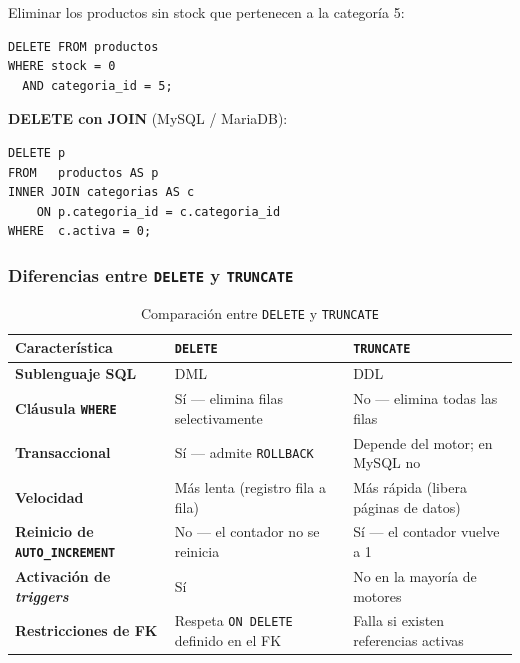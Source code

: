 \begin{ejemplo}
  Eliminar los productos sin stock que pertenecen a la categoría 5:

\begin{lstlisting}[style=sql, caption={DELETE con condición compuesta}]
DELETE FROM productos
WHERE stock = 0
  AND categoria_id = 5;
\end{lstlisting}
\end{ejemplo}

\textbf{DELETE con JOIN} (MySQL / MariaDB):

\begin{lstlisting}[style=sql, caption={DELETE que filtra mediante una tabla relacionada}]
DELETE p
FROM   productos AS p
INNER JOIN categorias AS c
    ON p.categoria_id = c.categoria_id
WHERE  c.activa = 0;
\end{lstlisting}

\subsubsection*{Diferencias entre \texttt{DELETE} y \texttt{TRUNCATE}}

\begin{table}[H]
  \centering
  \caption{Comparación entre \texttt{DELETE} y \texttt{TRUNCATE}}
  \renewcommand{\arraystretch}{1.3}
  \begin{tabularx}{\textwidth}{>{\bfseries}l X X}
    \toprule
    \textbf{Característica}     & \textbf{\texttt{DELETE}}                        & \textbf{\texttt{TRUNCATE}}                   \\
    \midrule
    Sublenguaje SQL             & DML                                             & DDL                                          \\
    Cláusula \texttt{WHERE}     & Sí — elimina filas selectivamente               & No — elimina todas las filas                 \\
    Transaccional               & Sí — admite \texttt{ROLLBACK}                   & Depende del motor; en MySQL no               \\
    Velocidad                   & Más lenta (registro fila a fila)                & Más rápida (libera páginas de datos)         \\
    Reinicio de \texttt{AUTO\_INCREMENT} & No — el contador no se reinicia       & Sí — el contador vuelve a 1                  \\
    Activación de \textit{triggers} & Sí                                         & No en la mayoría de motores                  \\
    Restricciones de FK         & Respeta \texttt{ON DELETE} definido en el FK   & Falla si existen referencias activas         \\
    \bottomrule
  \end{tabularx}
\end{table}

